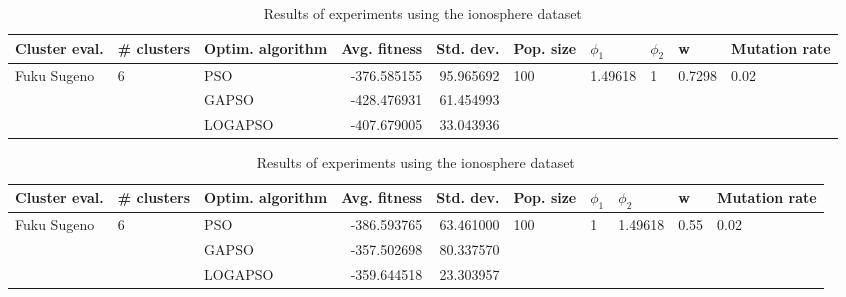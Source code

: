 \documentclass{article}
\begin{document}
\begin{table}
\centering
\caption{Results of experiments using the ionosphere dataset}
\begin{tabular}{lllrrlllll}
\toprule
               Cluster eval. &        \# clusters & Optim. algorithm &  Avg. fitness &  Std. dev. &            Pop. size &               $\phi_{1}$ &         $\phi_{2}$ &                       w &         Mutation rate \\
\midrule
\multirow{3}{*}{Fuku Sugeno} & \multirow{3}{*}{6} &              PSO &   -376.585155 &  95.965692 & \multirow{3}{*}{100} & \multirow{3}{*}{1.49618} & \multirow{3}{*}{1} & \multirow{3}{*}{0.7298} & \multirow{3}{*}{0.02} \\
                             &                    &            GAPSO &   -428.476931 &  61.454993 &                      &                          &                    &                         &                       \\
                             &                    &          LOGAPSO &   -407.679005 &  33.043936 &                      &                          &                    &                         &                       \\
\bottomrule
\end{tabular}
\end{table}
\begin{table}
\centering
\caption{Results of experiments using the ionosphere dataset}
\begin{tabular}{lllrrlllll}
\toprule
               Cluster eval. &        \# clusters & Optim. algorithm &  Avg. fitness &  Std. dev. &            Pop. size &         $\phi_{1}$ &               $\phi_{2}$ &                     w &         Mutation rate \\
\midrule
\multirow{3}{*}{Fuku Sugeno} & \multirow{3}{*}{6} &              PSO &   -386.593765 &  63.461000 & \multirow{3}{*}{100} & \multirow{3}{*}{1} & \multirow{3}{*}{1.49618} & \multirow{3}{*}{0.55} & \multirow{3}{*}{0.02} \\
                             &                    &            GAPSO &   -357.502698 &  80.337570 &                      &                    &                          &                       &                       \\
                             &                    &          LOGAPSO &   -359.644518 &  23.303957 &                      &                    &                          &                       &                       \\
\bottomrule
\end{tabular}
\end{table}
\end{document}
